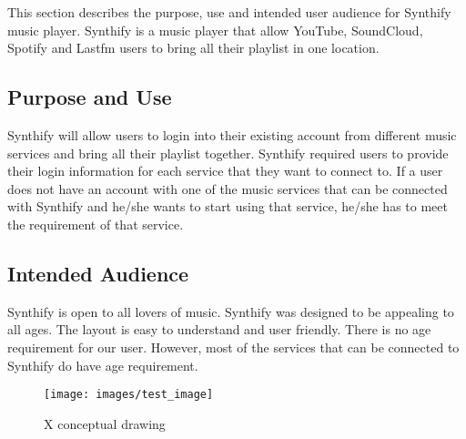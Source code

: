 This section describes the purpose, use and intended user audience for Synthify music player. Synthify is a music player that allow YouTube, SoundCloud, Spotify and Lastfm users to bring all their playlist in one location.

\subsection{Purpose and Use}
Synthify will allow users to login into their existing account from different music services and bring all their playlist together. Synthify required users to provide their login information for each service that they want to connect to. If a user does not have an account with one of the music services that can be connected with Synthify and he/she wants to start using that service, he/she has to meet the requirement of that service. 

\subsection{Intended Audience}
Synthify is open to all lovers of music. Synthify was designed to be appealing to all ages. The layout is easy to understand and user friendly. There is no age requirement for our user. However, most of the services that can be connected to Synthify do have age requirement. 

\begin{figure}[h!]
	\centering
   	\texttt{[image: images/test\_image]}
    \caption{X conceptual drawing}
\end{figure}
